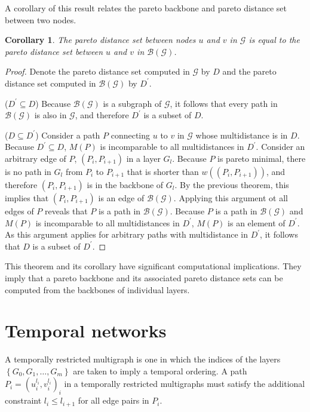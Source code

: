 \documentclass{article}
\newtheorem{corollary}{Corollary}[theorem]
\begin{document}
A corollary of this result relates the pareto backbone and pareto distance set between two nodes.

\begin{corollary}
    The pareto distance set between nodes $u$ and $v$ in $\mathcal{G}$ is equal to the pareto distance
    set between $u$ and $v$ in $\mathcal{B}(\mathcal{G})$.
\end{corollary}
\begin{proof}
    Denote the pareto distance set computed in $\mathcal{G}$ by $D$ and the pareto distance set computed
    in $\mathcal{B}(\mathcal{G})$ by $D^\prime$. 
    
    ($D^\prime\subseteq D$) Because $\mathcal{B}(\mathcal{G})$ is a subgraph of
    $\mathcal{G}$, it follows that every path in $\mathcal{B}(\mathcal{G})$ is also in $\mathcal{G}$, and
    therefore $D^\prime$ is a subset of $D$.

    ($D\subseteq D^\prime$) Consider a path $P$ connecting $u$ to $v$ in $\mathcal{G}$ whose
    multidistance is in $D$. Because $D^\prime\subseteq D$, $M(P)$ is incomparable to
    all multidistances in $D^\prime$. Consider an arbitrary edge of $P$, $(P_i,P_{i+1})$
    in a layer $G_l$. Because $P$ is pareto minimal, there is no path in $G_l$ from $P_i$ to
    $P_{i+1}$ that is shorter than $w((P_i,P_{i+1}))$, and therefore $(P_i,P_{i+1})$ is in the backbone
    of $G_l$. By the previous theorem, this implies that $(P_i,P_{i+1})$ is an edge of 
    $\mathcal{B}(\mathcal{G})$. Applying this argument ot all edges of $P$ reveals that $P$ is a path in
    $\mathcal{B}(\mathcal{G})$. Because $P$ is a path in $\mathcal{B}(\mathcal{G})$ and $M(P)$ is 
    incomparable to
    all multidistances in $D^\prime$, $M(P)$ is an element of $D^\prime$. As this argument applies for 
    arbitrary paths with multidistance in $D^\prime$, it follows that $D$ is a subset of
    $D^\prime$.
\end{proof}

This theorem and its corollary have significant computational implications. They imply that a pareto
backbone and its associated pareto distance sets can be computed from the backbones of individual layers.

\section{Temporal networks}
A temporally restricted multigraph is one in which the indices of the layers 
$\left\{G_0,G_1,\ldots,G_m\right\}$ are taken to imply a temporal ordering. A path 
$P_i={(u_i^{l_i},v_i^{l_i})}_i$ in a temporally restricted multigraphs must satisfy the
additional constraint $l_i\leq l_{i+1}$ for all edge pairs in $P_i$.
\end{document}
